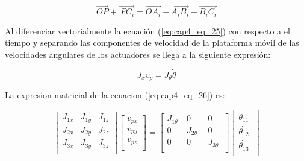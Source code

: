         \begin{equation}
             \overrightarrow{OP}+\overrightarrow{~PC_{i}} =\overrightarrow{OA_{i}}+\overrightarrow{A_{i}B_{i}}+\overrightarrow{B_{i}C_{i}}  
         \label{eq:cap4_eq_25}
        \end{equation}

        Al diferenciar vectorialmente la ecuación (\ref{eq:cap4_eq_25}) con respecto a el tiempo y separando las componentes de velocidad de la plataforma móvil de las velocidades angulares de los actuadores se llega a la siguiente expresión:
        
        \begin{equation}
            J_{x}v_{p}=J_{ \theta }\dot{ \theta } 
            \label{eq:cap4_eq_26}
        \end{equation}
        
        La expresion matricial de la ecuacion (\ref{eq:cap4_eq_26}) es:
        
        \begin{equation}
                \left[ \begin{matrix}
                J_{1x}  &  J_{1y}  &  J_{1z}\\
                J_{2x}  &  J_{2y}  &  J_{2z}\\
                J_{3x}  &  J_{3y}  &  J_{3z}\\
                \end{matrix}
                 \right]  \left[ \begin{matrix}
                v_{px}\\
                v_{py}\\
                v_{pz}\\
                \end{matrix}
                 \right] = \left[ \begin{matrix}
                J_{1 \theta }~  &  0  &  0\\
                0  &  J_{2 \theta }~~  &  0\\
                0  &  0  &  J_{3 \theta }~\\
                \end{matrix}
                 \right]  \left[ \begin{matrix}
                \dot{ \theta _{11}}~\\
                \dot{ \theta _{12}}\\
                \dot{ \theta _{13}}~\\
                \end{matrix}
                 \right]
                \label{eq:cap4_eq_27}
        \end{equation}
        
